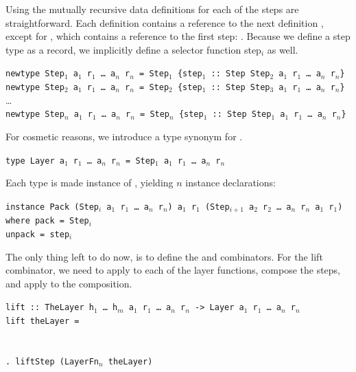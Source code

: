 \documentclass[preprint,natbib]{sigplanconf}
\begin{document}
Using  the mutually recursive data definitions for each of the steps are straightforward. Each definition  contains a reference to the next definition , except for , which contains a reference to the first step: . Because we define a step type as a record, we implicitly define a selector function {step$_i$} as well.

\begin{small}
{\tt newtype Step$_1$ a$_1$ r$_1$ \dots~a$_n$ r$_n$ = Step$_1$ \{step$_1$}\verb| :: |{\tt Step Step$_2$ a$_1$ r$_1$ \dots~a$_n$ r$_n$\}}\\
{\tt newtype Step$_2$ a$_1$ r$_1$ \dots~a$_n$ r$_n$ = Step$_2$ \{step$_1$}\verb| :: |{\tt Step Step$_3$ a$_1$ r$_1$ \dots~a$_n$ r$_n$\}}\\
\dots \\
{\tt newtype Step$_n$ a$_1$ r$_1$ \dots~a$_n$ r$_n$ = Step$_n$ \{step$_1$}\verb| :: |{\tt Step Step$_1$ a$_1$ r$_1$ \dots~a$_n$ r$_n$\}}
\end{small}

For cosmetic reasons, we introduce a type synonym  for .

{\tt type Layer a$_1$ r$_1$ \dots~a$_n$ r$_n$ = Step$_1$ a$_1$ r$_1$ \dots~a$_n$ r$_n$}

Each  type is made instance of , yielding $n$ instance declarations:

\begin{small}
\begin{tabbing}
{\tt i}\={\tt nstance Pack (Step$_i$ a$_1$ r$_1$ \dots~a$_n$  r$_n$) a$_1$ r$_1$ (Step$_{i+1}$ a$_2$ r$_2$ \dots~a$_n$ r$_n$ a$_1$ r$_1$)}\\
\> {\tt where }\={\tt pack = Step$_i$}\\
\>\> {\tt unpack = step$_i$}
\end{tabbing}
\end{small}
\ec
{}

The only thing left to do now, is to define the  and  combinators. For the lift combinator, we need to apply  to each of the layer functions, compose the steps, and apply  to the composition. 

\begin{small}
\begin{tabbing}
{\tt lift}\verb| :: |{\tt TheLayer h$_1$ \dots ~h$_m$ a$_1$ r$_1$ \dots ~a$_n$ r$_n$ -> Layer a$_1$ r$_1$ \dots ~a$_n$ r$_n$}\\
{\tt li}\={\tt ft t}\={\tt heLayer = }\\
\\
\>\>{\tt \dots}\\ 
\>\>\verb|. lift|{\tt Step (LayerFn$_n$ theLayer)}
\end{tabbing}
\end{small}%
\end{document}
